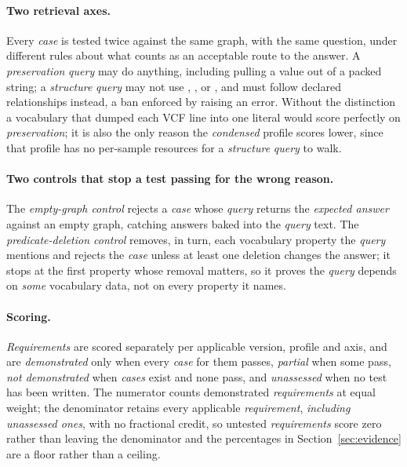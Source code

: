 \paragraph{Two retrieval axes.}
Every \emph{case} is tested twice against the same graph, with the same question, under different rules about what counts as an acceptable route to the answer.
A \emph{preservation} \emph{query} may do anything, including pulling a value out of a packed string; a \emph{structure} \emph{query} may not use , ,  or , and must follow declared relationships instead, a ban enforced by raising an error.
Without the distinction a vocabulary that dumped each VCF line into one literal would score perfectly on \emph{preservation}; it is also the only reason the \textit{condensed} profile scores lower, since that profile has no per-sample resources for a \emph{structure} \emph{query} to walk.

\paragraph{Two controls that stop a test passing for the wrong reason.}
The \emph{empty-graph control} rejects a \emph{case} whose \emph{query} returns the \emph{expected answer} against an empty graph, catching answers baked into the \emph{query} text.
The \emph{predicate-deletion control} removes, in turn, each vocabulary property the \emph{query} mentions and rejects the \emph{case} unless at least one deletion changes the answer; it stops at the first property whose removal matters, so it proves the \emph{query} depends on \emph{some} vocabulary data, not on every property it names.

\paragraph{Scoring.}
\emph{Requirements} are scored separately per applicable version, profile and axis, and are \emph{demonstrated} only when every \emph{case} for them passes, \emph{partial} when some pass, \emph{not demonstrated} when \emph{cases} exist and none pass, and \emph{unassessed} when no test has been written.
The numerator counts demonstrated \emph{requirements} at equal weight; the denominator retains every applicable \emph{requirement}, \emph{including unassessed ones}, with no fractional credit, so untested \emph{requirements} score zero rather than leaving the denominator and the percentages in Section~\ref{sec:evidence} are a floor rather than a ceiling.

